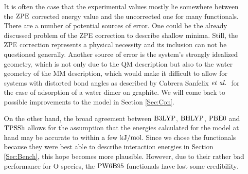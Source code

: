 It is often the case that the experimental values mostly lie somewhere between
the $\text{ZPE}$ corrected energy value and the uncorrected one for many functionals.
There are a number of potential sources of error. One could be the already
discussed problem of the ZPE correction to describe shallow minima. Still,
the ZPE correction represents a physical necessity and its inclusion can not
be questioned generally.
Another source of error is the system's strongly
idealized geometry, which is not only due to the QM description but also to
the water geometry of the MM description, which would make it difficult to
allow for systems with distorted bond angles as described by Cabrera Sanfelix $\emph{et al.}~$ 
for the case of adsorption of a water dimer on
graphite.\cite{CabreraSanfelix2003}
We will come back to possible improvements to the model in Section
\ref{Sec:Con}.


On the other hand, the broad agreement between $\text{B3LYP}$, $\text{BHLYP}$, $\text{PBE0}$
and $\text{TPSSh}$ allows for the assumption that the energies calculated for the
model at hand may be accurate to within a few $\text {kJ/mol}$. Since we chose
the functionals because they were best able to describe interaction
energies in Section \ref{Sec:Bench}, this hope becomes more plausible.
However, due to their rather bad performance for O species, the $\text{PW6B95}$
functionals have lost some credibility.




